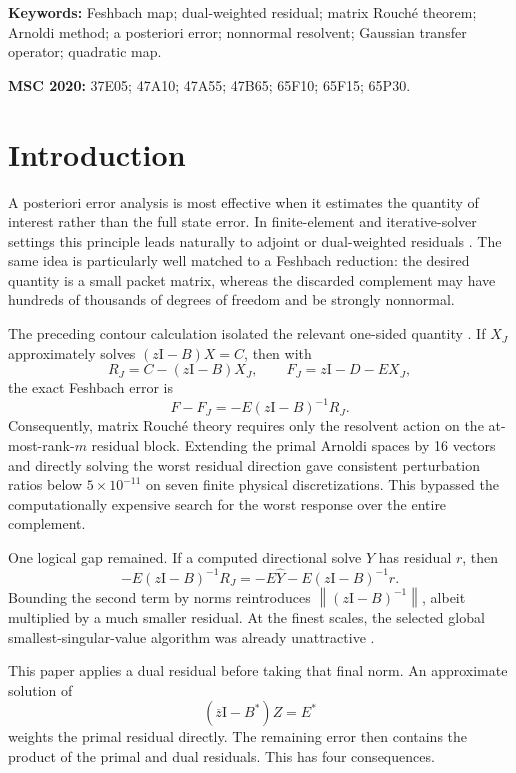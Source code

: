 \documentclass[11pt]{article}
\theoremstyle{definition}
\theoremstyle{remark}
\newcommand{\Id}{\mathrm I}
\newcommand{\norm}[1]{\left\lVert#1\right\rVert}
\begin{document}
\noindent\textbf{Keywords:} Feshbach map; dual-weighted residual; matrix
Rouch\'e theorem; Arnoldi method; a posteriori error; nonnormal resolvent;
Gaussian transfer operator; quadratic map.

\medskip
\noindent\textbf{MSC 2020:} 37E05; 47A10; 47A55; 47B65; 65F10; 65F15;
65P30.

\section{Introduction}
\label{sec:introduction}

A posteriori error analysis is most effective when it estimates the
quantity of interest rather than the full state error.  In finite-element
and iterative-solver settings this principle leads naturally to adjoint or
dual-weighted residuals \citep{BeckerRannacher2001,GilesSuli2002}.  The same
idea is particularly well matched to a Feshbach reduction: the desired
quantity is a small packet matrix, whereas the discarded complement may
have hundreds of thousands of degrees of freedom and be strongly
nonnormal.

The preceding contour calculation isolated the relevant one-sided
quantity \citep{WangDirectionalRouche2026}.  If \(X_J\) approximately
solves \((z\Id-B)X=C\), then with
\[
 R_J=C-(z\Id-B)X_J,
 \qquad F_J=z\Id-D-EX_J,
\]
the exact Feshbach error is
\begin{equation}
 F-F_J=-E(z\Id-B)^{-1}R_J.
 \label{eq:rh25-directional}
\end{equation}
Consequently, matrix Rouch\'e theory requires only the resolvent action on
the at-most-rank-\(m\) residual block.  Extending the primal Arnoldi spaces
by 16 vectors and directly solving the worst residual direction gave
consistent perturbation ratios below \(5\times10^{-11}\) on seven finite
physical discretizations.  This bypassed the computationally expensive
search for the worst response over the entire complement.

One logical gap remained.  If a computed directional solve
\(\widehat Y\) has residual \(r\), then
\[
 -E(z\Id-B)^{-1}R_J
 =-E\widehat Y-E(z\Id-B)^{-1}r.
\]
Bounding the second term by norms reintroduces
\(\norm{(z\Id-B)^{-1}}\), albeit multiplied by a much smaller residual.
At the finest scales, the selected global smallest-singular-value algorithm
was already unattractive \citep{WangDirectionalRouche2026}.

This paper applies a dual residual before taking that final norm.  An
approximate solution of
\[
 (\overline z\Id-B^*)Z=E^*
\]
weights the primal residual directly.  The remaining error then contains
the product of the primal and dual residuals.  This has four consequences.
\end{document}
